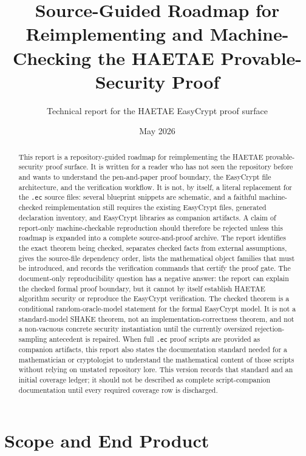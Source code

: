 \documentclass[11pt]{report}
\title{Source-Guided Roadmap for Reimplementing and Machine-Checking the HAETAE Provable-Security Proof}
\author{Technical report for the HAETAE EasyCrypt proof surface}
\date{May 2026}
\DeclareRobustCommand{\file}[1]{\ifmmode\text{\nolinkurl{#1}}\else\nolinkurl{#1}\fi}
\theoremstyle{definition}
\theoremstyle{plain}
\begin{document}
\maketitle

\begin{abstract}
This report is a repository-guided roadmap for reimplementing the HAETAE
provable-security proof surface.  It is written for a reader who has not seen
the repository before and wants to understand the pen-and-paper proof boundary,
the EasyCrypt file architecture, and the verification workflow.  It is not, by
itself, a literal replacement for the \file{.ec} source files: several blueprint
snippets are schematic, and a faithful machine-checked reimplementation still
requires the existing EasyCrypt files, generated declaration inventory, and
EasyCrypt libraries as companion artifacts.  A claim of report-only
machine-checkable reproduction should therefore be rejected unless this roadmap
is expanded into a complete source-and-proof archive.  The report identifies the
exact theorem being checked, separates checked facts from external assumptions, gives
the source-file dependency order, lists the mathematical object families that
must be introduced, and records the verification commands that certify the proof
gate.  The document-only reproducibility question has a negative answer: the
report can explain the checked formal proof boundary, but it cannot by itself
establish HAETAE algorithm security or reproduce the EasyCrypt verification.
The checked theorem is a conditional random-oracle-model statement for the
formal EasyCrypt model.  It is not a standard-model SHAKE theorem, not an
implementation-correctness theorem, and not a non-vacuous concrete security
instantiation until the currently oversized rejection-sampling antecedent is
repaired.  When full \file{.ec} proof scripts are provided as companion
artifacts, this report also states the documentation standard needed for a
mathematician or cryptologist to understand the mathematical content of those
scripts without relying on unstated repository lore.  This version records that
standard and an initial coverage ledger; it should not be described as complete
script-companion documentation until every required coverage row is discharged.
\end{abstract}

\tableofcontents
\clearpage
{}

\chapter{Scope and End Product}
\end{document}
